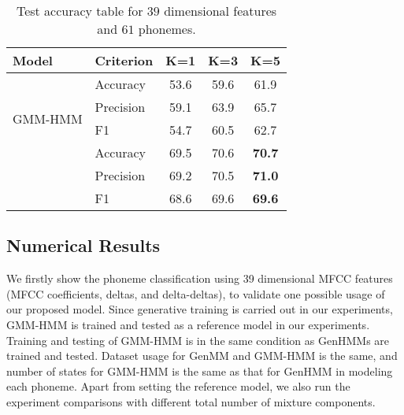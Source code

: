 \begin{table}
  \caption{Test accuracy table for $39$ dimensional features and $61$ phonemes.}\label{tab:acc-classification39f_b}
  \centering  
  \begin{tabular}{llccc} \toprule
    {Model} & Criterion & K=1 &  K=3 &  K=5
    \\ \midrule
    \multirow{4}{*}{GMM-HMM}
            & Accuracy    & 53.6 &  59.6 & 61.9  \\
            & {Precision} & 59.1 &  63.9 & 65.7 \\
            & {F1}        & 54.7 &  60.5 & 62.7\\
    \midrule
    \multirow{3}{*}{GenHMM}
            & Accuracy    & 69.5 & 70.6 & \textbf{70.7}   \\
            & {Precision} & 69.2 & 70.5 & \textbf{71.0}   \\
            & {F1}        & 68.6 & 69.6 & \textbf{69.6}   \\
    \bottomrule
  \end{tabular}
  \vspace{0.5cm}
\end{table}


\subsection{Numerical Results}

We firstly show the phoneme classification using 39 dimensional MFCC features (MFCC coefficients, deltas, and delta-deltas), to validate one possible usage of our proposed model. Since generative training is carried out in our experiments, GMM-HMM is trained and tested as a reference model in our experiments. Training and testing of GMM-HMM is in the same condition as GenHMMs are trained and tested. Dataset usage for GenMM and GMM-HMM is the same, and number of states for GMM-HMM is the same as that for GenHMM in modeling each phoneme. Apart from setting the reference model, we also run the experiment comparisons with different total number of mixture components.

